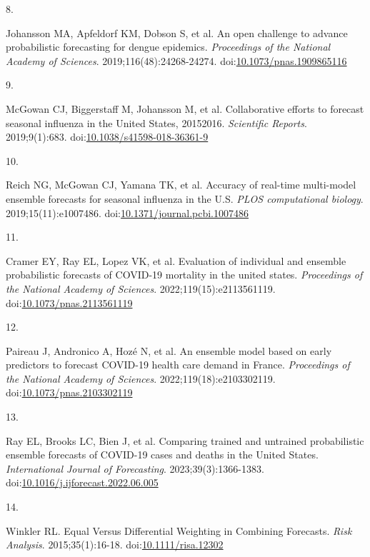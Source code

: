 \documentclass[
  letterpaper,
  DIV=11,
  numbers=noendperiod]{scrartcl}
\newlength{\cslhangindent}
\newlength{\csllabelwidth}
\newenvironment{CSLReferences}[2] %
 {\begin{list}{}{%
  \setlength{\itemindent}{0pt}
  \setlength{\leftmargin}{0pt}
  \setlength{\parsep}{0pt}
  \ifodd #1
   \setlength{\leftmargin}{\cslhangindent}
   \setlength{\itemindent}{-1\cslhangindent}
  \fi
  \setlength{\itemsep}{#2\baselineskip}}}
 {\end{list}}
\newcommand{\CSLLeftMargin}[1]{\parbox[t]{\csllabelwidth}{\strut#1\strut}}
\newcommand{\CSLRightInline}[1]{\parbox[t]{\linewidth - \csllabelwidth}{\strut#1\strut}}
\begin{document}
\begin{CSLReferences}{0}{1}
\CSLLeftMargin{8. }%
\CSLRightInline{Johansson MA, Apfeldorf KM, Dobson S, et al. An open
challenge to advance probabilistic forecasting for dengue epidemics.
\emph{Proceedings of the National Academy of Sciences}.
2019;116(48):24268-24274.
doi:\href{https://doi.org/10.1073/pnas.1909865116}{10.1073/pnas.1909865116}}

\CSLLeftMargin{9. }%
\CSLRightInline{McGowan CJ, Biggerstaff M, Johansson M, et al.
Collaborative efforts to forecast seasonal influenza in the United
States, 2015{\textendash}2016. \emph{Scientific Reports}. 2019;9(1):683.
doi:\href{https://doi.org/10.1038/s41598-018-36361-9}{10.1038/s41598-018-36361-9}}

\CSLLeftMargin{10. }%
\CSLRightInline{Reich NG, McGowan CJ, Yamana TK, et al. Accuracy of
real-time multi-model ensemble forecasts for seasonal influenza in the
{U}.{S}. \emph{PLOS computational biology}. 2019;15(11):e1007486.
doi:\href{https://doi.org/10.1371/journal.pcbi.1007486}{10.1371/journal.pcbi.1007486}}

\CSLLeftMargin{11. }%
\CSLRightInline{Cramer EY, Ray EL, Lopez VK, et al. Evaluation of
individual and ensemble probabilistic forecasts of COVID-19 mortality in
the united states. \emph{Proceedings of the National Academy of
Sciences}. 2022;119(15):e2113561119.
doi:\href{https://doi.org/10.1073/pnas.2113561119}{10.1073/pnas.2113561119}}

\CSLLeftMargin{12. }%
\CSLRightInline{Paireau J, Andronico A, Hozé N, et al. An ensemble model
based on early predictors to forecast {COVID}-19 health care demand in
{France}. \emph{Proceedings of the National Academy of Sciences}.
2022;119(18):e2103302119.
doi:\href{https://doi.org/10.1073/pnas.2103302119}{10.1073/pnas.2103302119}}

\CSLLeftMargin{13. }%
\CSLRightInline{Ray EL, Brooks LC, Bien J, et al. Comparing trained and
untrained probabilistic ensemble forecasts of {COVID}-19 cases and
deaths in the {United} {States}. \emph{International Journal of
Forecasting}. 2023;39(3):1366-1383.
doi:\href{https://doi.org/10.1016/j.ijforecast.2022.06.005}{10.1016/j.ijforecast.2022.06.005}}

\CSLLeftMargin{14. }%
\CSLRightInline{Winkler RL. Equal Versus Differential Weighting in
Combining Forecasts. \emph{Risk Analysis}. 2015;35(1):16-18.
doi:\href{https://doi.org/10.1111/risa.12302}{10.1111/risa.12302}}


\end{CSLReferences}
\end{document}
